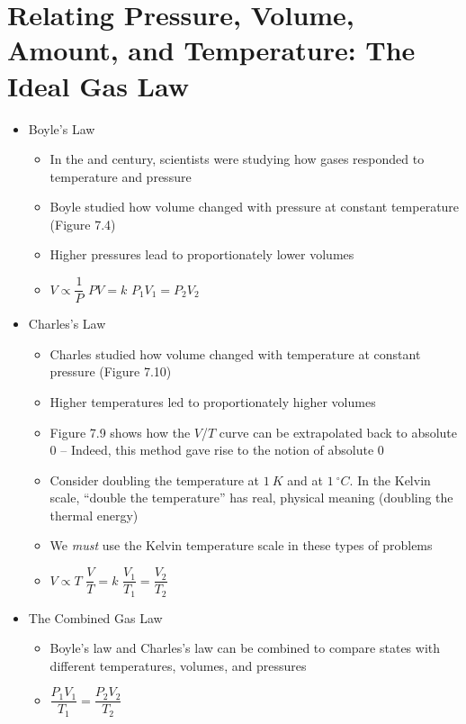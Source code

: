 \documentclass[12pt, openany, letterpaper]{memoir}
\begin{document}
\section{Relating Pressure, Volume, Amount, and Temperature: The Ideal Gas Law}
\begin{itemize}
  \item Boyle's Law
    \begin{itemize}
      \item In the  and  century, scientists were studying how gases responded to temperature and pressure
      \item Boyle studied how volume changed with pressure at constant temperature (Figure 7.4)
      \item Higher pressures lead to proportionately lower volumes
      \item $V\propto \dfrac{1}{P}$ \hspace{2em} $PV=k$ \hspace{2em} $P_1V_1=P_2V_2$
    \end{itemize}
  \item Charles's Law
    \begin{itemize}
      \item Charles studied how volume changed with temperature at constant pressure (Figure 7.10)
      \item Higher temperatures led to proportionately higher volumes
      \item Figure 7.9 shows how the $V$/$T$ curve can be extrapolated back to absolute $0$ -- Indeed, this method gave rise to the notion of absolute $0$
      \item Consider doubling the temperature at $1~K$ and at $1~^\circ C$. In the Kelvin scale, ``double the temperature'' has real, physical meaning (doubling the thermal energy)
      \item We \emph{must} use the Kelvin temperature scale in these types of problems
      \item $V\propto T$ \hspace{2em} $\dfrac{V}{T} = k$ \hspace{2em} $\dfrac{V_1}{T_1}=\dfrac{V_2}{T_2}$
    \end{itemize}
  \item The Combined Gas Law
    \begin{itemize}
      \item Boyle's law and Charles's law can be combined to compare states with different temperatures, volumes, and pressures
      \item $\dfrac{P_1V_1}{T_1}=\dfrac{P_2V_2}{T_2}$


\end{itemize}
\end{itemize}
\end{document}
